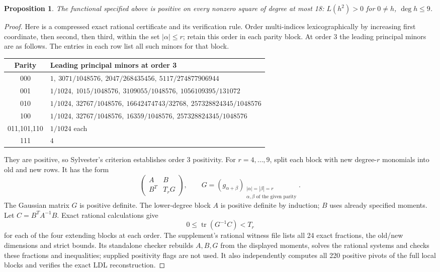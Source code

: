 \documentclass[11pt]{article}
\newtheorem{proposition}{Proposition}
\newcommand{\tr}{\operatorname{tr}}
\begin{document}
\begin{proposition}\label{prop:certificate}
The functional specified above is positive on every nonzero square of
degree at most 18: $L(h^2)>0$ for $0\ne h$, $\deg h\le9$.
\end{proposition}
\begin{proof}
Here is a compressed exact rational certificate and its verification rule.
Order multi-indices lexicographically by increasing first coordinate,
then second, then third, within the set $|\alpha|\le r$; retain this order
in each parity block. At order 3 the leading principal minors are as follows.
The entries in each row list all such minors for that block.
\begin{center}\small
\begin{tabular}{c l}
\toprule
Parity&Leading principal minors at order 3\\\midrule
000&$1,\ 3071/1048576,\ 2047/268435456,\ 5117/274877906944$\\
001&$1/1024,\ 1015/1048576,\ 3109055/1048576,\ 1056109395/131072$\\
010&$1/1024,\ 32767/1048576,\ 16642474743/32768,\ 257328824345/1048576$\\
100&$1/1024,\ 32767/1048576,\ 16359/1048576,\ 257328824345/1048576$\\
011,101,110&$1/1024$ each\\
111&$4$\\\bottomrule
\end{tabular}
\end{center}
They are positive, so Sylvester's criterion establishes order 3 positivity.
For $r=4,\ldots,9$, split each block with new degree-$r$ monomials into
old and new rows. It has the form
\[
 \begin{pmatrix}A&B\\B^T&T_rG\end{pmatrix},\qquad
 G=(g_{\alpha+\beta})_{\substack{|\alpha|=|\beta|=r\\
                            \alpha,\beta\text{ of the given parity}}}.
\]
The Gaussian matrix $G$ is positive definite. The lower-degree block $A$
is positive definite by induction; $B$ uses already specified moments.
Let $C=B^TA^{-1}B$. Exact rational calculations give
\begin{equation}\label{eq:traces}
                   0\le\tr(G^{-1}C)<T_r
\end{equation}
for each of the four extending blocks at each order. The supplement's rational witness file
 lists all 24 exact fractions,
the old/new dimensions and strict bounds. Its standalone checker rebuilds
$A,B,G$ from the displayed moments, solves the rational systems and
checks these fractions and inequalities; supplied positivity flags are
not used. It also independently computes all 220 positive pivots of the
full local blocks and verifies the exact LDL reconstruction.


\end{proof}
\end{document}
